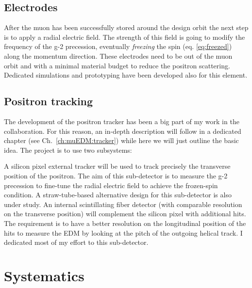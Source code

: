 \begin{refsection}
    \subsection{Electrodes}
        After the muon has been successfully stored around the design orbit the next step is to apply a radial electric field. 
        The strength of this field is going to modify the frequency of the g-2 precession, eventually \textit{freezing} the spin (eq. \ref{eq:freezed}) along the momentum direction.
        These electrodes need to be out of the muon orbit and with a minimal material budget to reduce the positron scattering.  
        Dedicated simulations and prototyping have been developed also for this element.

    \subsection{Positron tracking}
        The development of the positron tracker has been a big part of my work in the collaboration.
        For this reason, an in-depth description will follow in a dedicated chapter (see Ch.~\ref{ch:muEDM:tracker}) while here we will just outline the basic idea.
        The project is to use two subsystems:
        \begin{outline}
            \1 A silicon pixel external tracker will be used to track precisely the transverse position of the positron. 
            The aim of this sub-detector is to measure the g-2 precession to fine-tune the radial electric field to achieve the frozen-spin condition.
            A straw-tube-based alternative design for this sub-detector is also under study.
            \1 An internal scintillating fiber detector (with comparable resolution on the transverse position) will complement the silicon pixel with additional hits. 
            The requirement is to have a better resolution on the longitudinal position of the hits to measure the EDM by looking at the pitch of the outgoing helical track.
            I dedicated most of my effort to this sub-detector.
        \end{outline}

\section{Systematics}
\label{muEDM:systematics}


\cite{muEDM:Semertzidis:2001} \cite{muEDM:g-2:2008} \cite{muEDM:Adelmann:2010} \cite{muEDM:J-PARC:2011} \cite{muEDM:J-PARC:2016} \cite{muEDM:PSI:2021} \cite{muEDM:PSI:Mikio:2022} \cite{muEDM:PSI:Kim:2022}


\end{refsection}
